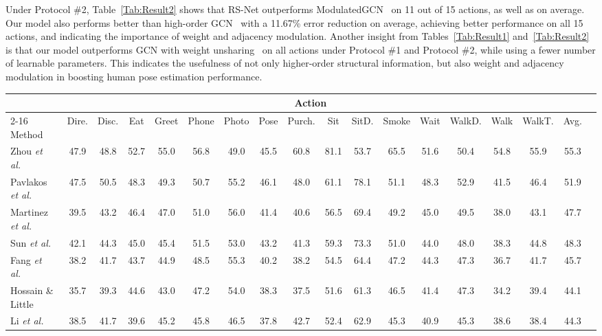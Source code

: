 \documentclass[10pt,journal]{IEEEtran}
\begin{document}
Under Protocol \#2, Table~\ref{Tab:Result2} shows that RS-Net outperforms ModulatedGCN~\cite{zou2021modulated} on 11 out of 15 actions, as well as on average. Our model also performs better than high-order GCN~\cite{zou2020high} with a 11.67\% error reduction on average, achieving better performance on all 15 actions, and indicating the importance of weight and adjacency modulation. Another insight from Tables~\ref{Tab:Result1} and~\ref{Tab:Result2} is that our model outperforms GCN with weight unsharing~\cite{liu2020comprehensive} on all actions under Protocol \#1 and  Protocol \#2, while using a fewer number of learnable parameters. This indicates the usefulness of not only higher-order structural information, but also weight and adjacency modulation in boosting human pose estimation performance.
	
\begin{table*}[!htb]
\caption{Performance comparison of our model and baseline methods using PA-MPJPE on Human3.6M under Protocol \#2.}
\small
\setlength{\tabcolsep}{1pt}
\smallskip
\centering
\begin{tabular}{l*{17}{c}}
\toprule[1pt]
& \multicolumn{15}{c}{Action}\\
\cmidrule(lr){2-16}
Method & Dire. & Disc. &  Eat & Greet & Phone & Photo &  Pose & Purch. & Sit & SitD. & Smoke & Wait & WalkD. & Walk & WalkT. & Avg.\\
\midrule[.8pt]
Zhou \textit{et al.}~\cite{zhou2017towards} & 47.9& 48.8 &52.7& 55.0& 56.8& 49.0 &45.5 &60.8& 81.1 &53.7& 65.5& 51.6& 50.4 &54.8 &55.9& 55.3\\
Pavlakos \textit{et al.}~\cite{pavlakos2017coarse} & 47.5 &50.5 &48.3& 49.3& 50.7 &55.2 &46.1 &48.0& 61.1& 78.1 &51.1& 48.3& 52.9& 41.5& 46.4 &51.9 \\
Martinez \textit{et al.}~\cite{martinez2017simple} & 39.5 &43.2 &46.4 &47.0 &51.0& 56.0 &41.4& 40.6 &56.5& 69.4& 49.2& 45.0& 49.5& 38.0 &43.1 &47.7\\
Sun \textit{et al.}~\cite{sun2017compositional} & 42.1& 44.3& 45.0 &45.4 &51.5 &53.0 &43.2& 41.3& 59.3 &73.3& 51.0& 44.0& 48.0& 38.3& 44.8& 48.3\\
Fang \textit{et al.}~\cite{fang2018learning} & 38.2& 41.7& 43.7& 44.9& 48.5 &55.3& 40.2& 38.2& 54.5 &64.4& 47.2 &44.3& 47.3& 36.7& 41.7& 45.7\\
Hossain \& Little~\cite{rayat2018exploiting}  & 35.7 & 39.3& 44.6 &43.0& 47.2& 54.0& 38.3 &37.5 &51.6 &61.3& 46.5& 41.4 &47.3 &34.2 &39.4& 44.1\\
Li \textit{et al.}~\cite{ChenLiLee:2020} & 38.5 & 41.7 & 39.6 & 45.2 & 45.8 & 46.5 & 37.8 & 42.7 & 52.4 & 62.9 & 45.3 & 40.9 & 45.3 & 38.6 & 38.4 & 44.3\\

\end{tabular}
\end{table*}
\end{document}
